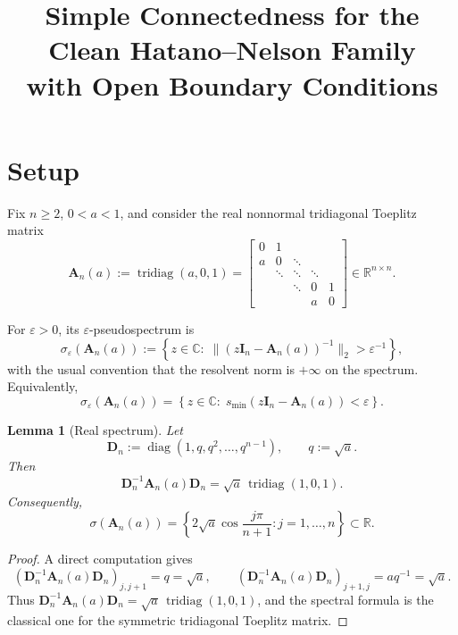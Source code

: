 \documentclass[11pt]{article}
\title{Simple Connectedness for the Clean Hatano--Nelson Family\\
with Open Boundary Conditions}
\author{}
\date{}
\newtheorem{lemma}[theorem]{Lemma}
\DeclareMathOperator{\diag}{diag}
\DeclareMathOperator{\tridiag}{tridiag}
\newcommand{\R}{\mathbb{R}}
\newcommand{\C}{\mathbb{C}}
\begin{document}
\maketitle

\section{Setup}

Fix \(n\ge 2\), \(0<a<1\), and consider the real nonnormal tridiagonal Toeplitz matrix
\[
\mathbf A_n(a):=\tridiag(a,0,1)
=
\begin{bmatrix}
0 & 1 \\
a & 0 & \ddots \\
& \ddots & \ddots & \ddots \\
&& \ddots & 0 & 1 \\
&&& a & 0
\end{bmatrix}\in \R^{n\times n}.
\]

For \(\varepsilon>0\), its \(\varepsilon\)-pseudospectrum is
\[
\sigma_\varepsilon(\mathbf A_n(a))
:=
\left\{
z\in\C:\;
\|(z\mathbf I_n-\mathbf A_n(a))^{-1}\|_2>\varepsilon^{-1}
\right\},
\]
with the usual convention that the resolvent norm is \(+\infty\) on the spectrum.
Equivalently,
\[
\sigma_\varepsilon(\mathbf A_n(a))
=
\left\{
z\in\C:\;
s_{\min}(z\mathbf I_n-\mathbf A_n(a))<\varepsilon
\right\}.
\]

\begin{lemma}[Real spectrum]\label{lem:real-spectrum}
Let
\[
\mathbf D_n:=\diag(1,q,q^2,\dots,q^{n-1}),
\qquad
q:=\sqrt a.
\]
Then
\[
\mathbf D_n^{-1}\mathbf A_n(a)\mathbf D_n
=
\sqrt a\,\tridiag(1,0,1).
\]
Consequently,
\[
\sigma(\mathbf A_n(a))
=
\left\{
2\sqrt a \cos\frac{j\pi}{n+1}:j=1,\dots,n
\right\}
\subset \R.
\]
\end{lemma}

\begin{proof}
A direct computation gives
\[
(\mathbf D_n^{-1}\mathbf A_n(a)\mathbf D_n)_{j,j+1}=q=\sqrt a,
\qquad
(\mathbf D_n^{-1}\mathbf A_n(a)\mathbf D_n)_{j+1,j}=aq^{-1}=\sqrt a.
\]
Thus \(\mathbf D_n^{-1}\mathbf A_n(a)\mathbf D_n=\sqrt a\,\tridiag(1,0,1)\), and the spectral formula is the classical one for the symmetric tridiagonal Toeplitz matrix.
\end{proof}
\end{document}
